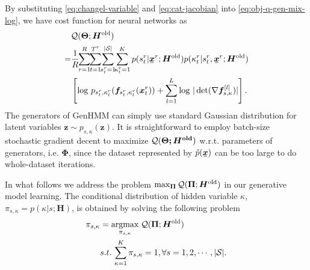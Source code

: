 \documentclass[letterpaper]{article} %
\newcommand{\ubar}[1]{\mkern2mu\underline{\mkern-2mu #1\mkern-2mu}\mkern2mu}
\newcommand{\ubm}[1]{\ubar{\bm{#1}}}
\newcommand{\ubmr}[2]{\ubar{\bm{#1}}^{#2}}
\newcommand{\bmtr}[3]{\bm{#1}^{#3}_{#2}}
\newcommand{\smtr}[3]{{#1}^{#3}_{#2}}
\begin{document}
By substituting \eqref{eq:changel-variable} and \eqref{eq:cat-jacobian} into \eqref{eq:obj-q-gen-mix-log}, we have cost function for neural networks as
\begin{align}\label{eq:obj-q-gen-mix}
  &\Qq(\bm{\Theta}; \bm{H}^{\mathrm{old}}) \nonumber \\
  =& \frac{1}{R}\hspace{-3pt}\sum_{r=1}^{R}\hspace{-3pt} \sum_{t=1}^{{T}^{r}}\hspace{-3pt} \sum_{\smtr{s}{t}{r}=1}^{|\Ss|} \hspace{-3pt} \sum_{\smtr{\kappa}{t}{r}=1}^{K}p(\smtr{s}{t}{r}| \ubmr{x}{r}; \bm{H}^{\mathrm{old}})p(\smtr{\kappa}{t}{r}|\smtr{s}{t}{r}, \ubmr{x}{r}; \bm{H}^{\mathrm{old}}) \nonumber\\
  &\left[ \log\, p_{\smtr{s}{t}{r}, \smtr{\kappa}{t}{r}}(\bm{f}_{\smtr{s}{t}{r}, \smtr{\kappa}{t}{r}}(\bmtr{x}{t}{r})) + \sum_{l=1}^{L}\log\,| \det (\nabla{\bm{f}_{s,\kappa}^{[l]}})|\right].
\end{align}
The generators of GenHMM can simply use standard Gaussian distribution for latent variables $\bm{z} \sim p_{s,\kappa}(\bm{z})$. It is straightforward to employ batch-size stochastic gradient decent to maximize $\mathcal{Q}(\bm{\Theta; \bm{H}^{\mathrm{old}}})$ w.r.t. parameters of generators, i.e. $\bm{\Phi}$, since the dataset represented by $\hat{p}(\ubm{x})$ can be too large to do whole-dataset iterations.

In what follows we address the problem $\max_{\bm{\Pi}} \mathcal{Q}(\bm{\Pi}; \bm{H}^{\mathrm{old}})$ in our generative model learning. The conditional distribution of hidden variable $\kappa$, $\pi_{s, \kappa} = p(\kappa | s; \bm{H})$, is obtained by solving the following problem
\begin{align}\label{opm:pi}
  \pi_{s, \kappa} & = \underset{\pi_{s, \kappa}}{\operatorname{argmax}}\; \mathcal{Q}(\bm{\Pi}; \bm{H}^{\mathrm{old}}) \\ \nonumber
                  & s.t. \, \sum_{\kappa=1}^{K} \pi_{s, \kappa}= 1, \forall s = 1, 2, \cdots, |\mathcal{S}|. 
\end{align}
\end{document}
